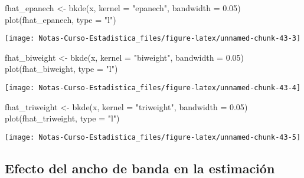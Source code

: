 \documentclass[
  12pt,
]{book}
\newenvironment{Shaded}{\begin{snugshade}}{\end{snugshade}}
\newcommand{\AttributeTok}[1]{\textcolor[rgb]{0.77,0.63,0.00}{#1}}
\newcommand{\FloatTok}[1]{\textcolor[rgb]{0.00,0.00,0.81}{#1}}
\newcommand{\FunctionTok}[1]{\textcolor[rgb]{0.00,0.00,0.00}{#1}}
\newcommand{\NormalTok}[1]{#1}
\newcommand{\OtherTok}[1]{\textcolor[rgb]{0.56,0.35,0.01}{#1}}
\newcommand{\StringTok}[1]{\textcolor[rgb]{0.31,0.60,0.02}{#1}}
\theoremstyle{definition}
\theoremstyle{definition}
\theoremstyle{definition}
\theoremstyle{definition}
\theoremstyle{remark}
\begin{document}
\begin{Shaded}
\begin{Highlighting}[]
\NormalTok{fhat\_epanech }\OtherTok{\textless{}{-}} \FunctionTok{bkde}\NormalTok{(x, }\AttributeTok{kernel =} \StringTok{"epanech"}\NormalTok{, }\AttributeTok{bandwidth =} \FloatTok{0.05}\NormalTok{)}
\FunctionTok{plot}\NormalTok{(fhat\_epanech, }\AttributeTok{type =} \StringTok{"l"}\NormalTok{)}
\end{Highlighting}
\end{Shaded}

\begin{center}\texttt{[image: Notas-Curso-Estadistica\_files/figure-latex/unnamed-chunk-43-3]} \end{center}

\begin{Shaded}
\begin{Highlighting}[]
\NormalTok{fhat\_biweight }\OtherTok{\textless{}{-}} \FunctionTok{bkde}\NormalTok{(x, }\AttributeTok{kernel =} \StringTok{"biweight"}\NormalTok{, }\AttributeTok{bandwidth =} \FloatTok{0.05}\NormalTok{)}
\FunctionTok{plot}\NormalTok{(fhat\_biweight, }\AttributeTok{type =} \StringTok{"l"}\NormalTok{)}
\end{Highlighting}
\end{Shaded}

\begin{center}\texttt{[image: Notas-Curso-Estadistica\_files/figure-latex/unnamed-chunk-43-4]} \end{center}

\begin{Shaded}
\begin{Highlighting}[]
\NormalTok{fhat\_triweight }\OtherTok{\textless{}{-}} \FunctionTok{bkde}\NormalTok{(x, }\AttributeTok{kernel =} \StringTok{"triweight"}\NormalTok{, }\AttributeTok{bandwidth =} \FloatTok{0.05}\NormalTok{)}
\FunctionTok{plot}\NormalTok{(fhat\_triweight, }\AttributeTok{type =} \StringTok{"l"}\NormalTok{)}
\end{Highlighting}
\end{Shaded}

\begin{center}\texttt{[image: Notas-Curso-Estadistica\_files/figure-latex/unnamed-chunk-43-5]} \end{center}

\hypertarget{efecto-del-ancho-de-banda-en-la-estimaciuxf3n}{%
\subsection{Efecto del ancho de banda en la estimación}\label{efecto-del-ancho-de-banda-en-la-estimaciuxf3n}}
\end{document}
